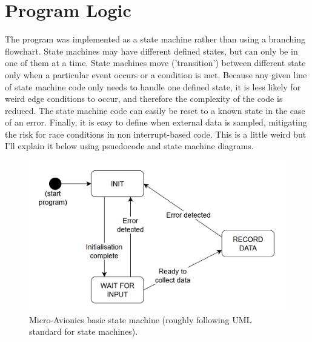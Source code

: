 \documentclass{article}
\begin{document}
    \section{Program Logic}

        The program was implemented as a state machine rather than using a branching flowchart.
        State machines may have different defined states, but can only be in one of them at a time.
        State machines move ('transition') between different state only when a particular event occurs or a condition is met.
        Because any given line of state machine code only needs to handle one defined state, it is less likely for weird edge conditions to occur, and therefore the complexity of the code is reduced.
        The state machine code can easily be reset to a known state in the case of an error.
        Finally, it is easy to define when external data is sampled, mitigating the risk for race conditions in non interrupt-based code.
        This is a little weird but I'll explain it below using psuedocode and state machine diagrams.

        \begin{figure}
            \centering
            \includegraphics{02-Images/avionics state machine.png}
            \caption{Micro-Avionics basic state machine (roughly following UML standard for state machines).}
            \label{fig:micav-basic-state-machine}
        \end{figure}
\end{document}
